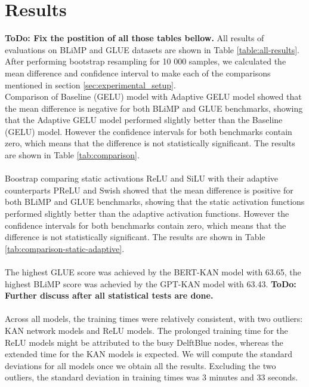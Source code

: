 \section{Results} %
\label{sec:results}
\textbf{ToDo: Fix the postition of all those tables bellow.}
All results of evaluations on BLiMP and GLUE datasets are shown in Table \ref{table:all-results}.\\
After performing bootstrap resampling for 10 000 samples, we calculated the mean difference and confidence interval to make each of the comparisons mentioned in section \ref{sec:experimental_setup}.\\
Comparison of Baseline (GELU) model with Adaptive GELU model showed that the mean difference is negative for both BLiMP and GLUE benchmarks, showing that the Adaptive GELU model performed slightly better than the Baseline (GELU) model. However the confidence intervals for both benchmarks contain zero, which means that the difference is not statistically significant. The results are shown in Table \ref{tab:comparison}.\\\\
Boostrap comparing static activations ReLU and SiLU with their adaptive counterparts PReLU and Swish showed that the mean difference is positive for both BLiMP and GLUE benchmarks, showing that the static activation functions performed slightly better than the adaptive activation functions. However the confidence intervals for both benchmarks contain zero, which means that the difference is not statistically significant. The results are shown in Table \ref{tab:comparison-static-adaptive}.\\\\
The highest GLUE score was achieved by the BERT-KAN model with 63.65, the highest BLiMP score was achevied by the GPT-KAN model with 63.43. \textbf{ToDo: Further discuss after all statistical tests are done.}\\\\
Across all models, the training times were relatively consistent, with two outliers: KAN network models and ReLU models. The prolonged training time for the ReLU models might be attributed to the busy DelftBlue nodes, whereas the extended time for the KAN models is expected. We will compute the standard deviations for all models once we obtain all the results. Excluding the two outliers, the standard deviation in training times was 3 minutes and 33 seconds.

